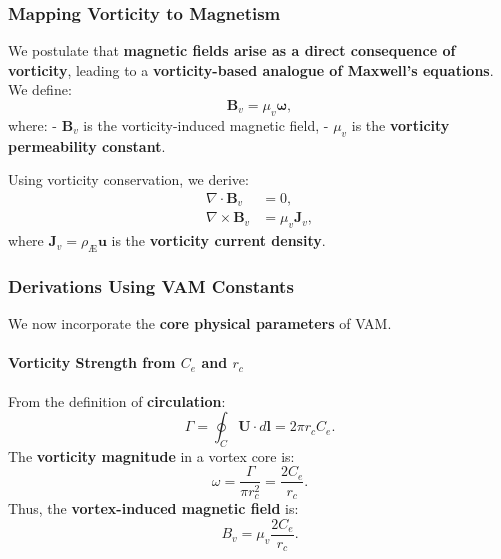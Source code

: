     \subsubsection*{Mapping Vorticity to Magnetism}
    We postulate that \textbf{magnetic fields arise as a direct consequence of vorticity}, leading to a \textbf{vorticity-based analogue of Maxwell’s equations}. We define:
    \begin{equation}
        \boldsymbol{B}_v = \mu_v \boldsymbol{\omega},
    \end{equation}
    where:
    - \( \boldsymbol{B}_v \) is the vorticity-induced magnetic field,
    - \( \mu_v \) is the \textbf{vorticity permeability constant}.

    Using vorticity conservation, we derive:
    \begin{align}
        \nabla \cdot \boldsymbol{B}_v &= 0, \\
        \nabla \times \boldsymbol{B}_v &= \mu_v \boldsymbol{J}_v,
    \end{align}
    where \( \boldsymbol{J}_v = \rho_{\text{\AE}} \boldsymbol{u} \) is the \textbf{vorticity current density}.

    \subsubsection*{Derivations Using VAM Constants}
    We now incorporate the \textbf{core physical parameters} of VAM.

    \paragraph*{Vorticity Strength from \( C_e \) and \( r_c \)}
    From the definition of \textbf{circulation}:
    \begin{equation}
        \Gamma = \oint_C \mathbf{U} \cdot d\mathbf{l} = 2\pi r_c C_e.
    \end{equation}
    The \textbf{vorticity magnitude} in a vortex core is:
    \begin{equation}
        \omega = \frac{\Gamma}{\pi r_c^2} = \frac{2 C_e}{r_c}.
    \end{equation}
    Thus, the \textbf{vortex-induced magnetic field} is:
    \begin{equation}
        B_v = \mu_v \frac{2 C_e}{r_c}.
    \end{equation}

